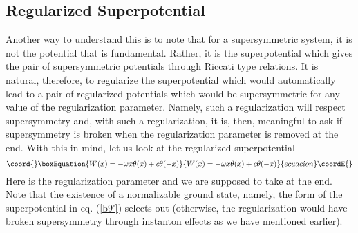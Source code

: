 \documentclass[a4paper,11pt]{article}
\begin{document}
\subsection*{Regularized Superpotential}

Another way to understand this is to note that for a supersymmetric system,
it is not the potential that is fundamental. Rather, it is the
superpotential which gives the pair of supersymmetric potentials
through  Riccati type relations. It is natural, therefore, to
regularize the superpotential which would automatically lead to a pair of
regularized potentials which would be supersymmetric for any value of
the regularization parameter. Namely, such a regularization will
respect supersymmetry and, with such a regularization, it is, then, 
meaningful to ask if supersymmetry is broken when the regularization
parameter is removed at the end. With this in mind, let us look at the
regularized superpotential
\begin{equation}\coord{}\boxEquation{
W(x) = -\omega x\theta(x) + c\theta(-x)\label{b12}
}{
W(x) = -\omega x\theta(x) + c\theta(-x)}{ecuacion}\coordE{}\end{equation}
Here \coordHE{} is the regularization parameter and we are supposed to take
\coordHE{} at the end. Note that the existence
of a normalizable ground state, namely, the form of the superpotential
in eq. (\ref{b9'}) selects out \coordHE{}
(otherwise, the regularization would have broken supersymmetry through
instanton effects as we have mentioned earlier).
\end{document}
